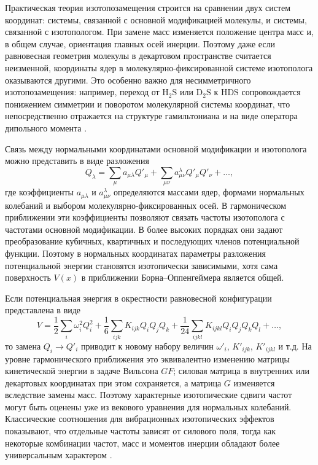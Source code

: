 Практическая теория изотопозамещения строится на сравнении двух систем
координат: системы, связанной с основной модификацией молекулы, и системы,
связанной с изотопологом. При замене масс изменяется положение центра масс и,
в общем случае, ориентация главных осей инерции. Поэтому даже если равновесная
геометрия молекулы в декартовом пространстве считается неизменной, координаты
ядер в молекулярно-фиксированной системе изотополога оказываются другими.
Это особенно важно для несимметричного изотопозамещения: например, переход от
$\mathrm{H_2S}$ или $\mathrm{D_2S}$ к $\mathrm{HDS}$ сопровождается понижением симметрии
и поворотом молекулярной системы координат, что непосредственно отражается на
структуре гамильтониана и на виде оператора дипольного момента
\cite{hds_sydow2019}.

Связь между нормальными координатами основной модификации и изотополога можно
представить в виде разложения
\begin{equation}
Q_\lambda=\sum_{\mu}a_{\mu\lambda}Q'_\mu+
\sum_{\mu\nu}a^{\lambda}_{\mu\nu}Q'_\mu Q'_\nu+\ldots,
\end{equation}
где коэффициенты $a_{\mu\lambda}$ и $a^{\lambda}_{\mu\nu}$ определяются массами ядер,
формами нормальных колебаний и выбором молекулярно-фиксированных осей.
В гармоническом приближении эти коэффициенты позволяют связать частоты
изотополога с частотами основной модификации. В более высоких порядках они
задают преобразование кубичных, квартичных и последующих членов потенциальной
функции. Поэтому в нормальных координатах параметры разложения потенциальной
энергии становятся изотопически зависимыми, хотя сама поверхность $V(x)$ в
приближении Борна--Оппенгеймера является общей.

Если потенциальная энергия в окрестности равновесной конфигурации представлена
в виде
\begin{equation}
V=\frac{1}{2}\sum_i \omega_i^2 Q_i^2+
\frac{1}{6}\sum_{ijk}K_{ijk}Q_iQ_jQ_k+
\frac{1}{24}\sum_{ijkl}K_{ijkl}Q_iQ_jQ_kQ_l+\ldots,
\end{equation}
то замена $Q_i\rightarrow Q'_i$ приводит к новому набору величин
$\omega'_i$, $K'_{ijk}$, $K'_{ijkl}$ и т.д. На уровне гармонического приближения
это эквивалентно изменению матрицы кинетической энергии в задаче Вильсона
$GF$; силовая матрица в внутренних или декартовых координатах при этом
сохраняется, а матрица $G$ изменяется вследствие замены масс. Поэтому
характерные изотопические сдвиги частот могут быть оценены уже из векового
уравнения для нормальных колебаний. Классические соотношения для вибрационных
изотопических эффектов показывают, что отдельные частоты зависят от силового
поля, тогда как некоторые комбинации частот, масс и моментов инерции обладают
более универсальным характером \cite{SalantRosenthal1932,WilsonDeciusCross1955}.


